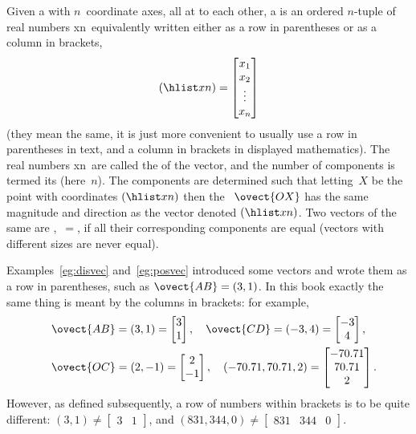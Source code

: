 \begin{definition} \label{def:vecs}
Given a  with \(n\)~coordinate axes, all at  to each other, a  is an ordered \(n\)-tuple of real numbers \hlist xn\ equivalently written either as a row in parentheses or as a column in brackets,
\begin{equation*}
(\hlist xn)=\begin{bmatrix} x_1\\x_2\\\vdots\\x_n \end{bmatrix}
\end{equation*}
(they mean the same, it is just more convenient to usually use a row in parentheses in text, and a column in brackets in displayed mathematics).
The real numbers \hlist xn\ are called the  of the vector, and the number of components is termed its  (here~\(n\)).
The components are determined such that letting~\(X\) be the point with coordinates \((\hlist xn)\) then the ~\(\ovect{OX}\) has the same magnitude and direction as the vector denoted \((\hlist xn)\).
Two vectors of the same  are ,~\(=\), if all their corresponding components are equal (vectors with different sizes are never equal).
\end{definition}

Examples~\ref{eg:disvec} and~\ref{eg:posvec} introduced some vectors and wrote them as a row in parentheses, such as \(\ovect{AB}=(3,1)\).
In this book exactly the same thing is meant by the columns in brackets: for example,
\begin{eqnarray*}&&
\ovect{AB}=(3,1)=\begin{bmatrix} 3\\1 \end{bmatrix},\quad
\ovect{CD}=(-3,4)=\begin{bmatrix} -3\\4 \end{bmatrix},\quad
\\&&
\ovect{OC}=(2,-1)=\begin{bmatrix} 2\\-1 \end{bmatrix},\quad
(-70.71,70.71,2)=\begin{bmatrix} -70.71\\70.71\\2 \end{bmatrix}.
\end{eqnarray*}
However, as defined subsequently, a row of numbers within brackets is to be quite different: \((3,1)\neq\begin{bmatrix} 3&1 \end{bmatrix}\),  and \((831,344,0)\neq\begin{bmatrix} 831&344&0 \end{bmatrix}\).

